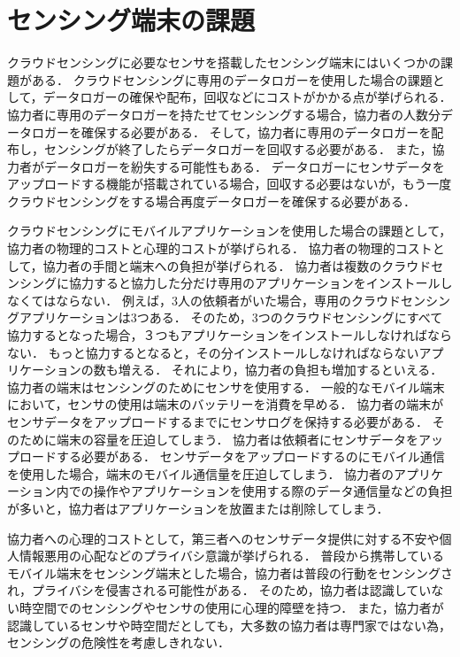 \section{センシング端末の課題}

クラウドセンシングに必要なセンサを搭載したセンシング端末にはいくつかの課題がある．
クラウドセンシングに専用のデータロガーを使用した場合の課題として，データロガーの確保や配布，回収などにコストがかかる点が挙げられる．
協力者に専用のデータロガーを持たせてセンシングする場合，協力者の人数分データロガーを確保する必要がある．
そして，協力者に専用のデータロガーを配布し，センシングが終了したらデータロガーを回収する必要がある．
また，協力者がデータロガーを紛失する可能性もある．
データロガーにセンサデータをアップロードする機能が搭載されている場合，回収する必要はないが，もう一度クラウドセンシングをする場合再度データロガーを確保する必要がある．

クラウドセンシングにモバイルアプリケーションを使用した場合の課題として，協力者の物理的コストと心理的コストが挙げられる．
協力者の物理的コストとして，協力者の手間と端末への負担が挙げられる．
協力者は複数のクラウドセンシングに協力すると協力した分だけ専用のアプリケーションをインストールしなくてはならない．
例えば，3人の依頼者がいた場合，専用のクラウドセンシングアプリケーションは3つある．
そのため，3つのクラウドセンシングにすべて協力するとなった場合，３つもアプリケーションをインストールしなければならない．
もっと協力するとなると，その分インストールしなければならないアプリケーションの数も増える．
それにより，協力者の負担も増加するといえる．
協力者の端末はセンシングのためにセンサを使用する．
一般的なモバイル端末において，センサの使用は端末のバッテリーを消費を早める．
協力者の端末がセンサデータをアップロードするまでにセンサログを保持する必要がある．
そのために端末の容量を圧迫してしまう．
協力者は依頼者にセンサデータをアップロードする必要がある．
センサデータをアップロードするのにモバイル通信を使用した場合，端末のモバイル通信量を圧迫してしまう．
協力者のアプリケーション内での操作やアプリケーションを使用する際のデータ通信量などの負担が多いと，協力者はアプリケーションを放置または削除してしまう．

協力者への心理的コストとして，第三者へのセンサデータ提供に対する不安や個人情報悪用の心配などのプライバシ意識が挙げられる．
普段から携帯しているモバイル端末をセンシング端末とした場合，協力者は普段の行動をセンシングされ，プライバシを侵害される可能性がある．
そのため，協力者は認識していない時空間でのセンシングやセンサの使用に心理的障壁を持つ．
また，協力者が認識しているセンサや時空間だとしても，大多数の協力者は専門家ではない為，センシングの危険性を考慮しきれない．

